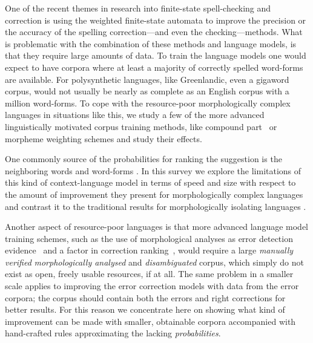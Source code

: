 \documentclass[a4paper,12pt]{article}
\begin{document}
One of the recent themes in research into finite-state spell-checking and
correction is using the weighted finite-state automata to improve the precision
or the accuracy of the spelling correction---and even the checking---methods.
What is problematic with the combination of these methods and language models,
is that they require large amounts of data. To train the language models one
would expect to have corpora where at least a majority of correctly spelled
word-forms are available.  For polysynthetic languages, like Greenlandic, even
a gigaword corpus, would not usually be nearly as complete as an English corpus
with a million word-forms. To cope with the resource-poor morphologically
complex languages in situations like this, we study a few of the more
advanced linguistically motivated corpus training methods, like compound
part~\cite[]{pirinen/2009/nodalida} or morpheme weighting schemes and study
their effects.

One commonly source of the probabilities for ranking the suggestion is the
neighboring words and word-forms \cite[]{pirinen2012improving,otero/2007}.  In
this survey we explore the limitations of this kind of context-language model
in terms of speed and size with respect to the amount of improvement they
present for morphologically complex languages and contrast it to the
traditional results for morphologically isolating languages
\cite[]{mays/1991,wilcoxohearn2008realword}.

Another aspect of resource-poor languages is that more advanced language model
training schemes, such as the use of morphological analyses as error detection
evidence~\cite[]{mays/1991} and a factor in correction
ranking~\cite[]{otero/2007}, would require a large \emph{manually verified}
\emph{morphologically analysed} and \emph{disambiguated} corpus, which simply
do not exist as open, freely usable resources, if at all. The same problem in a
smaller scale applies to improving the error correction models with data from
the error corpora; the corpus should contain both the errors and right
corrections for better results. For this reason we concentrate here on showing
what kind of improvement can be made with smaller, obtainable corpora
accompanied with hand-crafted rules approximating the lacking
\emph{probabilities}.
\end{document}
